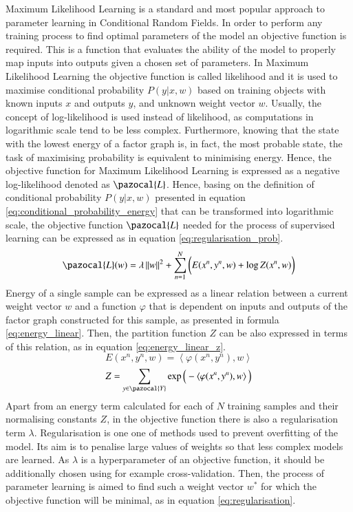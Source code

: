 Maximum Likelihood Learning is a standard and most popular approach to parameter learning in Conditional Random Fields. In order to perform any training process to find optimal parameters of the model an objective function is required. This is a function that evaluates the ability of the model to properly map inputs into outputs given a chosen set of parameters. In Maximum Likelihood Learning the objective function is called likelihood and it is used to maximise conditional probability $P(y|x,w)$ based on training objects with known inputs $x$ and outputs $y$, and unknown weight vector $w$. Usually, the concept of log-likelihood is used instead of likelihood, as computations in logarithmic scale tend to be less complex. Furthermore, knowing that the state with the lowest energy of a factor graph is, in fact, the most probable state, the task of maximising probability is equivalent to minimising energy. Hence, the objective function for Maximum Likelihood Learning is expressed as a negative log-likelihood denoted as $\pazocal{L}$. Hence, basing on the definition of conditional probability $P(y|x,w)$ presented in equation \ref{eq:conditional_probability_energy} that can be transformed into logarithmic scale, the objective function $\pazocal{L}$ needed for the process of supervised learning can be expressed as in equation \ref{eq:regularisation_prob}.
\begin{equation}
     \label{eq:regularisation_prob}
    \pazocal{L}(w) = \lambda \left \| w \right \|^2 + \sum_{n=1}^{N}\bigg({E(x^n,y^n,w)} + {\log{Z}(x^n,w)}\bigg)
\end{equation}
Energy of a single sample can be expressed as a linear relation between a current weight vector $w$ and a function $\varphi$ that is dependent on inputs and outputs of the factor graph constructed for this sample, as presented in formula \ref{eq:energy_linear}. Then, the partition function $Z$ can be also expressed in terms of this relation, as in equation \ref{eq:energy_linear_z}.
\begin{equation}
    \label{eq:energy_linear}
    E(x^n,y^n,w) = \left \langle \varphi(x^n,y^n),w \right \rangle 
\end{equation}
\begin{equation}
    \label{eq:energy_linear_z}
    Z = \sum_{y \in \pazocal{Y}}{\exp \Big(-\left \langle \varphi(x^n,y^n),w \right \rangle \Big)}
\end{equation}
Apart from an energy term calculated for each of $N$ training samples and their normalising constants $Z$, in the objective function there is also a regularisation term $\lambda$. Regularisation is one one of methods used to prevent overfitting of the model. Its aim is to penalise large values of weights so that less complex models are learned. As $\lambda$ is a hyperparameter of an objective function, it should be additionally chosen using for example cross-validation. Then, the process of parameter learning is aimed to find such a weight vector $w^*$ for which the objective function will be minimal, as in equation \ref{eq:regularisation}.

